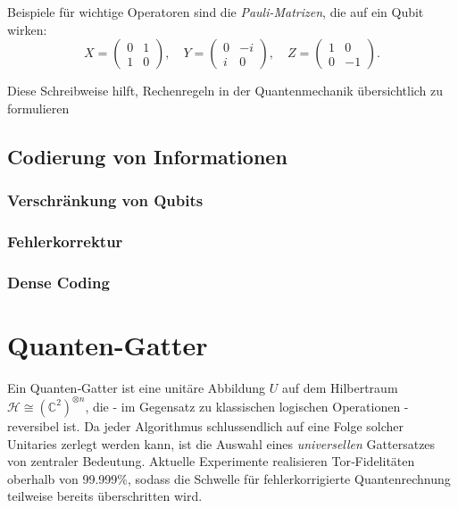 Beispiele für wichtige Operatoren sind die \emph{Pauli-Matrizen}, die auf ein Qubit wirken:
\[
X=\begin{pmatrix}0&1\\1&0\end{pmatrix},\quad
Y=\begin{pmatrix}0&-i\\i&0\end{pmatrix},\quad
Z=\begin{pmatrix}1&0\\0&-1\end{pmatrix}.
\]

Diese Schreibweise hilft, Rechenregeln in der Quantenmechanik übersichtlich zu formulieren

\subsection{Codierung von Informationen}
\subsubsection{Verschränkung von Qubits}
\subsubsection{Fehlerkorrektur}
\subsubsection{Dense Coding}




\section{Quanten-Gatter}\label{sec:quanten_gatter}
Ein Quanten‑Gatter ist eine unitäre Abbildung $U$ auf dem Hilbertraum $\mathcal H \cong (\mathbb C^2)^{\otimes n}$, die - im Gegensatz zu klassischen logischen Operationen - reversibel ist. Da jeder Algorithmus schlussendlich auf eine Folge solcher Unitaries zerlegt werden kann, ist die Auswahl eines
\emph{universellen} Gattersatzes von zentraler Bedeutung.
Aktuelle Experimente realisieren Tor‑Fidelitäten oberhalb von 99{.}999\%, sodass die Schwelle für fehlerkorrigierte Quantenrechnung teilweise bereits überschritten wird.\\

